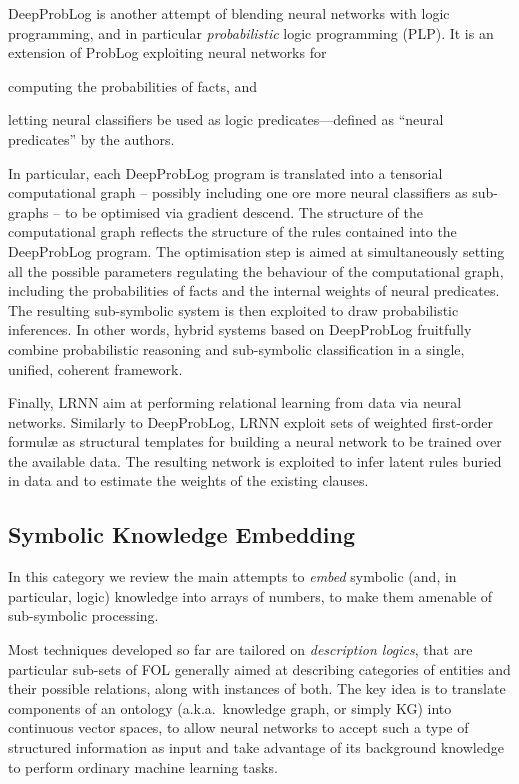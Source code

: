 \documentclass[12pt,a4paper,openright,twoside]{book}
\begin{document}
DeepProbLog \cite{Manhaeve2018} is another attempt of blending neural networks with logic programming, and in particular \emph{probabilistic} logic programming (PLP).
%
It is an extension of ProbLog exploiting neural networks for
%
\begin{inlinelist}
    \item computing the probabilities of facts, and
    \item letting neural classifiers be used as logic predicates---defined as ``neural predicates'' by the authors.
\end{inlinelist}
%
In particular, each DeepProbLog program is translated into a tensorial computational graph -- possibly including one ore more neural classifiers as sub-graphs -- to be optimised via gradient descend.
%
The structure of the computational graph reflects the structure of the rules contained into the DeepProbLog program.
%
The optimisation step is aimed at simultaneously setting all the possible parameters regulating the behaviour of the computational graph, including the probabilities of facts and the internal weights of neural predicates.
%
The resulting sub-symbolic system is then exploited to draw probabilistic inferences.
%
In other words, hybrid systems based on DeepProbLog fruitfully combine probabilistic reasoning and sub-symbolic classification in a single, unified, coherent framework.

Finally, LRNN \cite{SourekAZSK18} aim at performing relational learning from data via neural networks.
%
Similarly to DeepProbLog, LRNN exploit sets of weighted first-order formul\ae{} as structural templates for building a neural network to be trained over the available data.
%
The resulting network is exploited to infer latent rules buried in data and to estimate the weights of the existing clauses.

\subsection{Symbolic Knowledge Embedding}

In this category we review the main attempts to \emph{embed} symbolic (and, in particular, logic) knowledge into arrays of numbers, to make them amenable of sub-symbolic processing.

Most techniques developed so far are tailored on \emph{description logics}, that are particular sub-sets of FOL generally aimed at describing categories of entities and their possible relations, along with instances of both.
%
The key idea is to translate components of an ontology (a.k.a.\ knowledge graph, or simply KG) into continuous vector spaces, to allow neural networks to accept such a type of structured information as input and take advantage of its background knowledge to perform ordinary machine learning tasks.
\end{document}
